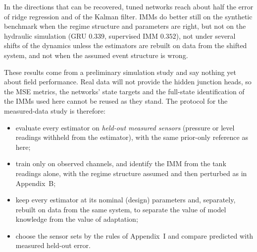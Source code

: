 \documentclass[conference]{IEEEtran}
\begin{document}
In the directions that can be recovered, tuned networks reach about half the error of ridge regression and of the Kalman filter. IMMs do better still on the synthetic benchmark when the regime structure and parameters are right, but not on the hydraulic simulation (GRU $0.339$, supervised IMM $0.352$), not under several shifts of the dynamics unless the estimators are rebuilt on data from the shifted system, and not when the assumed event structure is wrong.

These results come from a preliminary simulation study and say nothing yet about field performance. Real data will not provide the hidden junction heads, so the MSE metrics, the networks' state targets and the full-state identification of the IMMs used here cannot be reused as they stand. The protocol for the measured-data study is therefore:
\begin{itemize}
\item evaluate every estimator on \emph{held-out measured sensors} (pressure or level readings withheld from the estimator), with the same prior-only reference as here;
\item train only on observed channels, and identify the IMM from the tank readings alone, with the regime structure assumed and then perturbed as in Appendix~B;
\item keep every estimator at its nominal (design) parameters and, separately, rebuilt on data from the same system, to separate the value of model knowledge from the value of adaptation;
\item choose the sensor sets by the rules of Appendix~I and compare predicted with measured held-out error.
\end{itemize}
\end{document}
